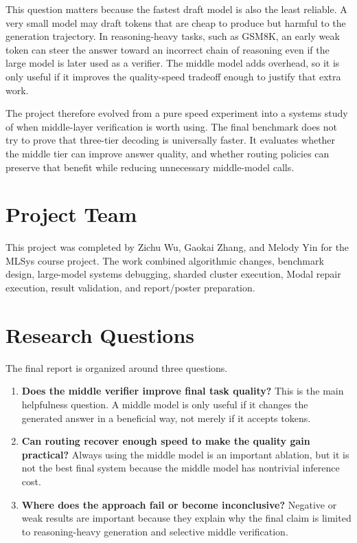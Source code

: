 \documentclass[11pt]{article}
\begin{document}
This question matters because the fastest draft model is also the least reliable. A very small model may draft tokens that are cheap to produce but harmful to the generation trajectory. In reasoning-heavy tasks, such as GSM8K, an early weak token can steer the answer toward an incorrect chain of reasoning even if the large model is later used as a verifier. The middle model adds overhead, so it is only useful if it improves the quality-speed tradeoff enough to justify that extra work.

The project therefore evolved from a pure speed experiment into a systems study of when middle-layer verification is worth using. The final benchmark does not try to prove that three-tier decoding is universally faster. It evaluates whether the middle tier can improve answer quality, and whether routing policies can preserve that benefit while reducing unnecessary middle-model calls.

\section{Project Team}

This project was completed by Zichu Wu, Gaokai Zhang, and Melody Yin for the MLSys course project. The work combined algorithmic changes, benchmark design, large-model systems debugging, sharded cluster execution, Modal repair execution, result validation, and report/poster preparation.

\section{Research Questions}

The final report is organized around three questions.

\begin{enumerate}
  \item \textbf{Does the middle verifier improve final task quality?} This is the main helpfulness question. A middle model is only useful if it changes the generated answer in a beneficial way, not merely if it accepts tokens.
  \item \textbf{Can routing recover enough speed to make the quality gain practical?} Always using the middle model is an important ablation, but it is not the best final system because the middle model has nontrivial inference cost.
  \item \textbf{Where does the approach fail or become inconclusive?} Negative or weak results are important because they explain why the final claim is limited to reasoning-heavy generation and selective middle verification.
\end{enumerate}
\end{document}
